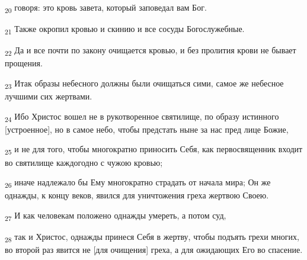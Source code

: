 \begin{tcolorbox}
\textsubscript{20} говоря: это кровь завета, который заповедал вам Бог.
\end{tcolorbox}
\begin{tcolorbox}
\textsubscript{21} Также окропил кровью и скинию и все сосуды Богослужебные.
\end{tcolorbox}
\begin{tcolorbox}
\textsubscript{22} Да и все почти по закону очищается кровью, и без пролития крови не бывает прощения.
\end{tcolorbox}
\begin{tcolorbox}
\textsubscript{23} Итак образы небесного должны были очищаться сими, самое же небесное лучшими сих жертвами.
\end{tcolorbox}
\begin{tcolorbox}
\textsubscript{24} Ибо Христос вошел не в рукотворенное святилище, по образу истинного [устроенное], но в самое небо, чтобы предстать ныне за нас пред лице Божие,
\end{tcolorbox}
\begin{tcolorbox}
\textsubscript{25} и не для того, чтобы многократно приносить Себя, как первосвященник входит во святилище каждогодно с чужою кровью;
\end{tcolorbox}
\begin{tcolorbox}
\textsubscript{26} иначе надлежало бы Ему многократно страдать от начала мира; Он же однажды, к концу веков, явился для уничтожения греха жертвою Своею.
\end{tcolorbox}
\begin{tcolorbox}
\textsubscript{27} И как человекам положено однажды умереть, а потом суд,
\end{tcolorbox}
\begin{tcolorbox}
\textsubscript{28} так и Христос, однажды принеся Себя в жертву, чтобы подъять грехи многих, во второй раз явится не [для очищения] греха, а для ожидающих Его во спасение.
\end{tcolorbox}
